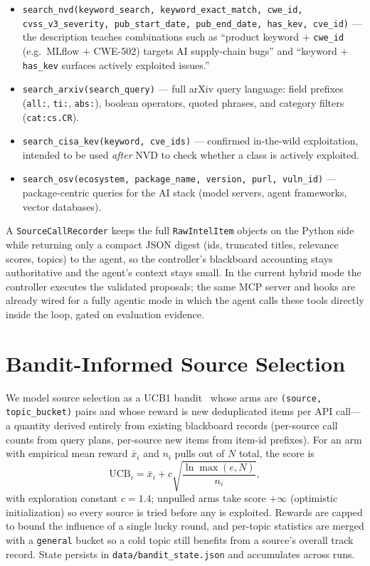 \documentclass[conference]{IEEEtran}
\newcommand{\code}[1]{\texttt{\small #1}}
\begin{document}
\begin{itemize}
  \item \code{search\_nvd(keyword\_search, keyword\_exact\_match, cwe\_id, cvss\_v3\_severity, pub\_start\_date, pub\_end\_date, has\_kev, cve\_id)} --- the description teaches combinations such as ``product keyword + \code{cwe\_id} (e.g.\ MLflow + CWE-502) targets AI supply-chain bugs'' and ``keyword + \code{has\_kev} surfaces actively exploited issues.''
  \item \code{search\_arxiv(search\_query)} --- full arXiv query language: field prefixes (\code{all:}, \code{ti:}, \code{abs:}), boolean operators, quoted phrases, and category filters (\code{cat:cs.CR}).
  \item \code{search\_cisa\_kev(keyword, cve\_ids)} --- confirmed in-the-wild exploitation, intended to be used \emph{after} NVD to check whether a class is actively exploited.
  \item \code{search\_osv(ecosystem, package\_name, version, purl, vuln\_id)} --- package-centric queries for the AI stack (model servers, agent frameworks, vector databases).
\end{itemize}

A \code{SourceCallRecorder} keeps the full \code{RawIntelItem} objects on the Python side while returning only a compact JSON digest (ids, truncated titles, relevance scores, topics) to the agent, so the controller's blackboard accounting stays authoritative and the agent's context stays small. In the current hybrid mode the controller executes the validated proposals; the same MCP server and hooks are already wired for a fully agentic mode in which the agent calls these tools directly inside the loop, gated on evaluation evidence.

\section{Bandit-Informed Source Selection}
\label{sec:bandit}

We model source selection as a UCB1 bandit~\cite{auer2002ucb} whose arms are \code{(source, topic\_bucket)} pairs and whose reward is new deduplicated items per API call---a quantity derived entirely from existing blackboard records (per-source call counts from query plans, per-source new items from item-id prefixes). For an arm with empirical mean reward $\bar{x}_i$ and $n_i$ pulls out of $N$ total, the score is
\begin{equation}
\mathrm{UCB}_i = \bar{x}_i + c\sqrt{\frac{\ln \max(e, N)}{n_i}},
\end{equation}
with exploration constant $c=1.4$; unpulled arms take score $+\infty$ (optimistic initialization) so every source is tried before any is exploited. Rewards are capped to bound the influence of a single lucky round, and per-topic statistics are merged with a \code{general} bucket so a cold topic still benefits from a source's overall track record. State persists in \code{data/bandit\_state.json} and accumulates across runs.
\end{document}

